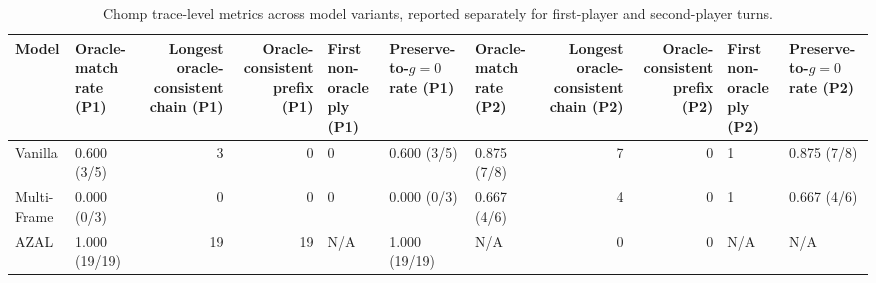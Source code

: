 \begin{table}[t]
\centering
\caption{Chomp trace-level metrics across model variants, reported separately for first-player and second-player turns.}
\label{tab:chomp_trace_metrics}
\begin{tabular}{llrrlllrrll}
\toprule
Model & Oracle-match rate (P1) & Longest oracle-consistent chain (P1) & Oracle-consistent prefix (P1) & First non-oracle ply (P1) & Preserve-to-$g=0$ rate (P1) & Oracle-match rate (P2) & Longest oracle-consistent chain (P2) & Oracle-consistent prefix (P2) & First non-oracle ply (P2) & Preserve-to-$g=0$ rate (P2) \\
\midrule
Vanilla & 0.600 (3/5) & 3 & 0 & 0 & 0.600 (3/5) & 0.875 (7/8) & 7 & 0 & 1 & 0.875 (7/8) \\
Multi-Frame & 0.000 (0/3) & 0 & 0 & 0 & 0.000 (0/3) & 0.667 (4/6) & 4 & 0 & 1 & 0.667 (4/6) \\
AZAL & 1.000 (19/19) & 19 & 19 & N/A & 1.000 (19/19) & N/A & 0 & 0 & N/A & N/A \\
\bottomrule
\end{tabular}
\end{table}
